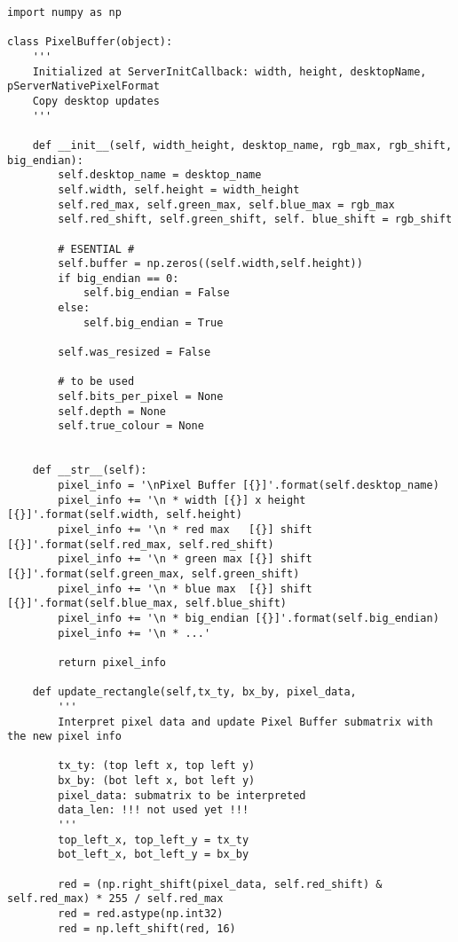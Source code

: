 \lstset{language=Python,frame=single, basicstyle=\ttfamily\small,  showstringspaces=false, breaklines=true}
\begin{lstlisting}
import numpy as np

class PixelBuffer(object):
    '''    
    Initialized at ServerInitCallback: width, height, desktopName, pServerNativePixelFormat
    Copy desktop updates
    '''
       
    def __init__(self, width_height, desktop_name, rgb_max, rgb_shift, big_endian):                
        self.desktop_name = desktop_name
        self.width, self.height = width_height
        self.red_max, self.green_max, self.blue_max = rgb_max
        self.red_shift, self.green_shift, self. blue_shift = rgb_shift

        # ESENTIAL #
        self.buffer = np.zeros((self.width,self.height))
        if big_endian == 0:
            self.big_endian = False
        else:
            self.big_endian = True
        
        self.was_resized = False 

        # to be used
        self.bits_per_pixel = None
        self.depth = None        
        self.true_colour = None
       

    def __str__(self):       
        pixel_info = '\nPixel Buffer [{}]'.format(self.desktop_name)
        pixel_info += '\n * width [{}] x height [{}]'.format(self.width, self.height)
        pixel_info += '\n * red max   [{}] shift [{}]'.format(self.red_max, self.red_shift)
        pixel_info += '\n * green max [{}] shift [{}]'.format(self.green_max, self.green_shift)
        pixel_info += '\n * blue max  [{}] shift [{}]'.format(self.blue_max, self.blue_shift)
        pixel_info += '\n * big_endian [{}]'.format(self.big_endian)
        pixel_info += '\n * ...'

        return pixel_info

    def update_rectangle(self,tx_ty, bx_by, pixel_data, 
        '''
        Interpret pixel data and update Pixel Buffer submatrix with the new pixel info

        tx_ty: (top left x, top left y)
        bx_by: (bot left x, bot left y)
        pixel_data: submatrix to be interpreted 
        data_len: !!! not used yet !!!
        '''
        top_left_x, top_left_y = tx_ty
        bot_left_x, bot_left_y = bx_by
        
        red = (np.right_shift(pixel_data, self.red_shift) & self.red_max) * 255 / self.red_max
        red = red.astype(np.int32)
        red = np.left_shift(red, 16)


\end{lstlisting}
